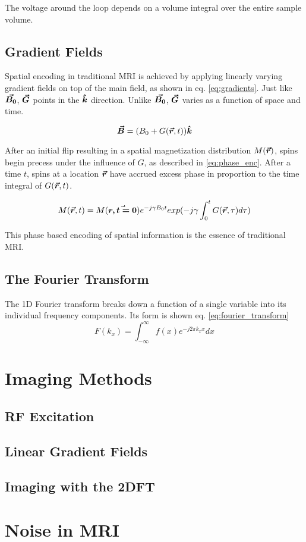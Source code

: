 The voltage around the loop depends on a volume integral over the entire sample volume.

\subsection{Gradient Fields}

Spatial encoding in traditional MRI is achieved by applying linearly varying gradient fields on top of the main field,
as shown in eq. \ref{eq:gradients}. Just like $\bm{\vec{B_0}}$, $\bm{\vec{G}}$ points in the $\bm{\hat{k}}$ direction. Unlike
$\bm{\vec{B_0}}$, $\bm{\vec{G}}$ varies as a function of space and time.

\begin{equation}\label{eq:gradients}
    \bm{\vec{B}} = (B_0 + G(\bm{\vec{r}},t))\bm{\hat{k}}
\end{equation}

After an initial flip resulting in a spatial magnetization distribution $M(\bm{\vec{r}})$, spins begin precess under the
influence of $G$, as described in \ref{eq:phase_enc}. After a time $t$, spins at a location $\bm{\vec{r}}$ have accrued
excess phase in proportion to the time integral of $G(\bm{\vec{r}},t)$.

\begin{equation}\label{eq:phase_enc}
    M(\bm{\vec{r}},t) = M(\bm{\vec{r,t=0}}) e^{-j \gamma B_0 t} exp(-j \gamma \int_0^t G(\bm{\vec{r}},\tau) d \tau)
\end{equation}

This phase based encoding of spatial information is the essence of traditional MRI.

\subsection{The Fourier Transform}
The 1D Fourier transform breaks down a function of a single variable into its individual frequency components. Its form
is shown eq. \ref{eq:fourier_transform}
\begin{equation}\label{eq:fourier_transform}
    F(k_x) = \int_{-\infty}^{\infty} f(x)e^{-j2\pi k_x x} dx
\end{equation}





\section{Imaging Methods}
\subsection{RF Excitation}
\subsection{Linear Gradient Fields}
\subsection{Imaging with the 2DFT}

\section{Noise in MRI}
